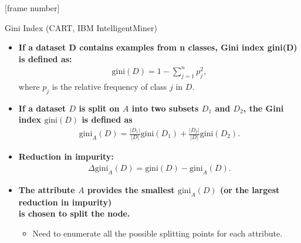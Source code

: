 \documentclass[aspectratio=169,t,table]{beamer}
\begin{document}
  {
    [frame number]
    \begin{frame}{Gini Index (CART, IBM IntelligentMiner)}
      \begin{itemize}
        \item \textbf{If a dataset D contains examples from n classes, Gini index gini(D) is defined as:}
        \begin{align}
          \text{gini}(D) = 1-\sum_{j=1}^{n} p_j^2,
        \end{align}
        where $p_j$ is the relative frequency of class $j$ in $D$.
        \item \textbf{If a dataset $D$ is split on $A$ into two subsets $D_1$ and $D_2$, the Gini index $\text{gini}(D)$ is defined as}
        \begin{align}
          \text{gini}_A(D) = \frac{|D_1|}{|D|}\text{gini}(D_1)+\frac{|D_2|}{|D|}\text{gini}(D_2).
        \end{align}
        \item \textbf{Reduction in impurity:}
        \begin{align}
          \Delta \text{gini}_A(D) = \text{gini}(D)-\text{gini}_A(D).
        \end{align}
        \item \textbf{The attribute $A$ provides the smallest $\text{gini}_A(D)$ (or the largest reduction in impurity) \\ is chosen to split the node.}
        \begin{itemize}
          \item Need to enumerate all the possible splitting points for each attribute.
        \end{itemize}
      \end{itemize}
    \end{frame}
  }
\end{document}
